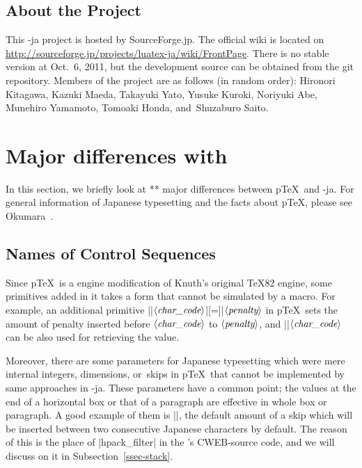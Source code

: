 \documentclass{ajt}
\begin{document}
\subsection*{About the Project}
This \LuaTeX-ja project is hosted by SourceForge.jp. The official wiki
is located on
\url{http://sourceforge.jp/projects/luatex-ja/wiki/FrontPage}.  There is
no stable version at Oct.\ 6, 2011, but the development source can be
obtained from the git repository.
Members of the project are as follows (in random order):
Hironori Kitagawa, Kazuki Maeda, Takayuki Yato,
Yusuke Kuroki, Noriyuki Abe, Munehiro Yamamoto, Tomoaki Honda, and~Shuzaburo Saito.


\section{Major differences with \pTeX}
In this section, we briefly look at ** major differences between p\TeX\
and \LuaTeX-ja.  For general information of Japanese typesetting and the
facts about p\TeX, please see Okumara~\cite{ptexjp}.


\subsection{Names of Control Sequences}
\label{ssec-csname}
Since p\TeX\ is a engine modification of Knuth's original \TeX82 engine,
some primitives added in it takes a form that cannot be simulated by a
macro.  For example, an additional primitive
|\prebreakpenalty|$\langle\hbox{\it
char\_code}\rangle$|[=]|$\langle\hbox{\it penalty}\rangle$ in p\TeX\
sets the amount of penalty inserted before $\langle\hbox{\it
char\_code}\rangle$ to $\langle\hbox{\it penalty}\rangle$, and
|\prebreakpenalty|$\langle\hbox{\it char\_code}\rangle$ can be also used
for retrieving the value.

Moreover, there are some parameters for Japanese typesetting which were
mere internal integers, dimensions, or~skips in p\TeX\ that cannot be
implemented by same approaches in \LuaTeX-ja.  These parameters have a
common point; the values at the end of a horizontal box or that of a
paragraph are effective in whole box or paragraph.  A good example of
them is |\kanjiskip|, the default amount of a skip which will be
inserted between two consecutive Japanese characters by default.  The
reason of this is the place of |hpack_filter| in the \LuaTeX's
CWEB-source code, and we will discuss on it in
Subsection~\ref{ssec-stack}.
\end{document}

